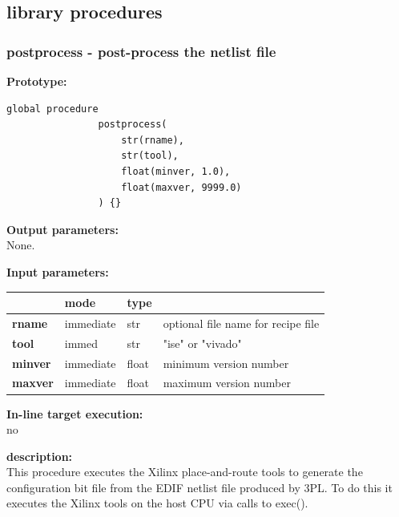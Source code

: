     \subsection{library procedures}

        \subsubsection{postprocess - post-process the netlist file}\label{sec:lppostprocess}

            {\bf Prototype:} \\
            \vsp
            \begin{lstlisting}[gobble=12, language=threepl]
                global procedure
                postprocess(
                    str(rname),
                    str(tool),
                    float(minver, 1.0),
                    float(maxver, 9999.0)
                ) {}
            \end{lstlisting}



            {\bf Output parameters:} \\
            
            None.

            {\bf Input parameters:} \\
            \begin{tabular}{| l | l | l | l |}
            \hline
                            & mode      & type   & \\
            \hline \hline
            {\bf rname}     & immediate & str    & optional file name for recipe file \\ \hline
            {\bf tool}      & immed     & str    & "ise" or "vivado" \\ \hline
            {\bf minver}    & immediate & float  & minimum version number  \\ \hline
            {\bf maxver}    & immediate & float  & maximum version number \\ \hline
            \end{tabular}

            {\bf In-line target execution:} \\
            no

            {\bf description:} \\
            This procedure executes the Xilinx place-and-route tools to
            generate the configuration bit file from the EDIF netlist file
            produced by 3PL. To do this it executes the Xilinx tools
            on the host CPU via calls to exec().
            
